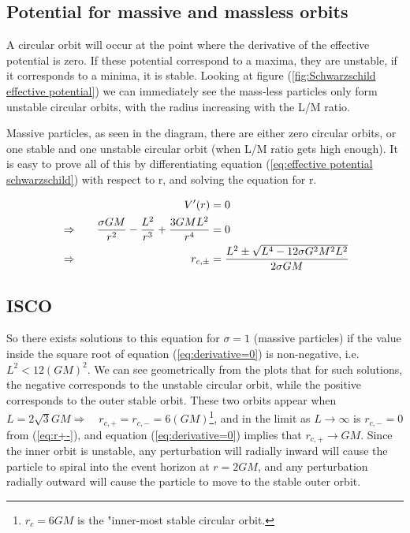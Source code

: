 \documentclass{article}
\begin{document}
\subsection{Potential for massive and massless orbits}\label{sec:Potential for massive and massless orbits}

A circular orbit will occur at the point where the derivative of the effective potential is zero. If these potential correspond to a maxima, they are unstable, if it corresponds to a minima, it is stable. Looking at figure (\ref{fig:Schwarzschild effective potential}) we can immediately see the mass-less particles only form unstable circular orbits, with the radius increasing with the L/M ratio.

Massive particles, as seen in the diagram, there are either zero circular orbits, or one stable and one unstable circular orbit (when L/M ratio gets high enough). It is easy to prove all of this by differentiating equation (\ref{eq:effective potential schwarzschild}) with respect to r, and solving the equation for r.

\begin{alignat}{2}
    &&V'(r)&=0\notag\\
    &\Rightarrow\quad
    &\frac{\sigma G M}{r^2} - \frac{L^2}{r^3} + \frac{3 G M L^2}{r^4}
    &=0 \label{eq:derivative=0}\\
    &\Rightarrow\quad 
    &r_{c,\pm}
    &=\frac{L^2 \pm \sqrt{L^4-12 \sigma G^2 M^2 L^2}}{2 \sigma G M}\label{eq:r+-}
\end{alignat}

\subsection{ISCO}\label{sec:ISCO}

So there exists solutions to this equation for $\sigma=1$ (massive particles) if the value inside the square root of equation (\ref{eq:derivative=0}) is non-negative, i.e. $L^2 < 12 (G M)^2$. We can see geometrically from the plots that for such solutions, the negative corresponds to the unstable circular orbit, while the positive corresponds to the outer stable orbit. These two orbits appear when $L=2\sqrt{3}GM \Rightarrow\quad r_{c,+}=r_{c,-}=6(GM)$\footnote{$r_c=6 GM$ is the "inner-most stable circular orbit.}, and in the limit as $L\longrightarrow \infty$ is $r_{c,-}=0$ from (\ref{eq:r+-}), and equation (\ref{eq:derivative=0}) implies that $r_{c,+}\rightarrow GM$. Since the inner orbit is unstable, any perturbation will radially inward will cause the particle to spiral into the event horizon at $r=2GM$, and any perturbation radially outward will cause the particle to move to the stable outer orbit. 
\end{document}
